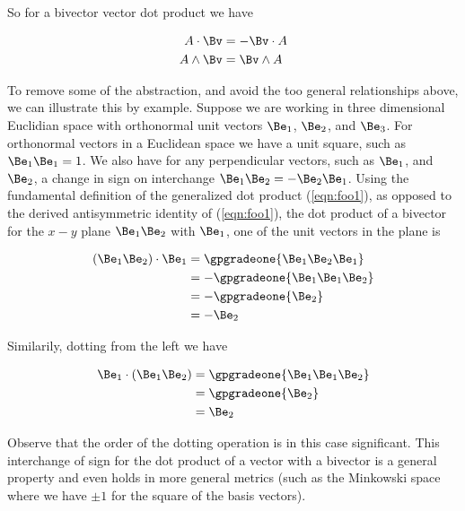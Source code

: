 So for a bivector vector dot product we have 

\begin{align}\label{eqn:foo2}
A \cdot \Bv &= - \Bv \cdot A \\
A \wedge \Bv &= \Bv \wedge A
\end{align}

To remove some of the abstraction, and avoid the too general relationships above, we can illustrate this by example.  Suppose we are working in three dimensional Euclidian space with orthonormal unit vectors $\Be_1$, $\Be_2$, and $\Be_3$.  For orthonormal vectors in a Euclidean space we have a unit square, such as $\Be_1 \Be_1 = 1$.  We also have for any perpendicular vectors, such as $\Be_1$, and $\Be_2$, a change in sign on interchange $\Be_1 \Be_2 = -\Be_2 \Be_1$.  Using the fundamental definition of the generalized dot product (\ref{eqn:foo1}), as opposed to the derived antisymmetric identity of (\ref{eqn:foo1}), the dot product of a bivector for the $x-y$ plane $\Be_1 \Be_2$ with $\Be_1$, one of the unit vectors in the plane is

\begin{align*}
(\Be_1 \Be_2) \cdot \Be_1
&=
\gpgradeone{ \Be_1 \Be_2 \Be_1 } \\
&=
-\gpgradeone{ \Be_1 \Be_1 \Be_2 } \\
&=
-\gpgradeone{ \Be_2 } \\
&=
-\Be_2
\end{align*}

Similarily, dotting from the left we have

\begin{align*}
\Be_1 \cdot (\Be_1 \Be_2) 
&=
\gpgradeone{ \Be_1 \Be_1 \Be_2 } \\
&=
\gpgradeone{ \Be_2 } \\
&=
\Be_2
\end{align*}

Observe that the order of the dotting operation is in this case significant.  This interchange of sign for the dot product of a vector with a bivector is a general property and even holds in more general metrics (such as the Minkowski space where we have $\pm 1$ for the square of the basis vectors).

\EndNoBibArticle
